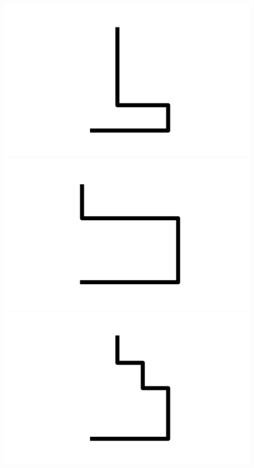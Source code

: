 \documentclass[]{report}
\begin{document}
\includegraphics[scale=.1]{pictures/18/state_cluster_shapes_16.pdf} 
\includegraphics[scale=.1]{pictures/18/state_cluster_shapes_17.pdf} 
\includegraphics[scale=.1]{pictures/18/state_cluster_shapes_18.pdf} 
\end{document}
